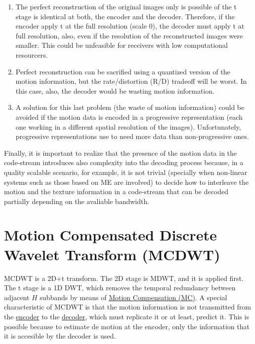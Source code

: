 \begin{enumerate}
\item The perfect reconstruction of the original images only is
  possible of the t stage is identical at both, the encoder and the
  decoder. Therefore, if the encoder apply t at the full resolution
  (scale 0), the decoder must apply t at full resolution, also, even
  if the resolution of the reconstructed images were smaller. This
  could be unfeasible for receivers with low computational resourcers.
\item Perfect reconstruction can be sacrified using a quantized
  version of the motion information, but the rate/distortion (R/D)
  tradeoff will be worst. In this case, also, the decoder would be
  wasting motion information.
\item A solution for this last problem (the waste of motion
  information) could be avoided if the motion data is encoded in a
  progressive representation (each one working in a different spatial
  resolution of the images). Unfortunately, progressive
  representations use to need more data than non-progressive ones.
\end{enumerate}

Finally, it is important to realize that the presence of the motion
data in the code-stream introduces also complexity into the decoding
process because, in a quality scalable scenario, for example, it is
not trivial (specially when non-linear systems such as those based on
ME are involved) to decide how to interleave the motion and the
texture information in a code-stream that can be decoded partially
depending on the avaliable bandwidth.

\section{Motion Compensated Discrete Wavelet Transform (MCDWT)}
MCDWT is a 2D+t transform. The 2D stage is MDWT, and it is applied
first. The t stage is a 1D DWT, which removes the temporal redundancy
between adjacent $H$ subbands by means of
\href{https://en.wikipedia.org/wiki/Motion_compensation}{Motion
  Compensation (MC)}. A special characteristic of MCDWT is that the
motion information is not transmitted from the
\href{https://en.wikipedia.org/wiki/Encoder}{encoder} to the
\href{https://en.wikipedia.org/wiki/Decoder}{decoder}, which must
replicate it or at least, predict it. This is possible because to
estimate de motion at the encoder, only the information that it is
accesible by the decoder is used.

